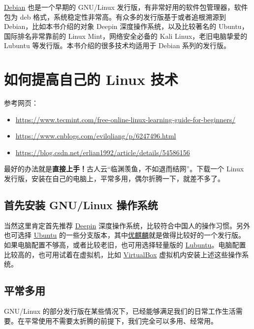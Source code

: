\documentclass[doctor,openright,twoside]{sjtuthesis}
\providecommand{\tightlist}{%
    \setlength{\itemsep}{0pt}\setlength{\parskip}{0pt}}
\theoremstyle{plain}
\theoremstyle{definition}
\theoremstyle{remark}
\theoremstyle{ocrenumbox}
\theoremstyle{plain}
\newcommand\cqh{“}
\newcommand\cqt{”}
\begin{document}
\href{https://baike.baidu.com/item/Debian}{Debian} 也是一个早期的
GNU/Linux 发行版，有非常好用的软件包管理器，软件包为 deb
格式，系统稳定性非常高。有众多的发行版基于或者追根溯源到
Debian，比如本书介绍的对象 Deepin 深度操作系统，以及比较著名的
Ubuntu，国际排名非常靠前的 Linux Mint，网络安全必备的 Kali
Linux，老旧电脑挚爱的 Lubuntu 等发行版。本书介绍的很多技术均适用于
Debian 系列的发行版。

\hypertarget{-linux-}{%
\section{如何提高自己的 Linux 技术}\label{-linux-}}

参考网页：

\begin{itemize}
\tightlist
\item
  \url{https://www.tecmint.com/free-online-linux-learning-guide-for-beginners/}
\item
  \url{https://www.cnblogs.com/evilqliang/p/6247496.html}
\item
  \url{https://blog.csdn.net/erlian1992/article/details/54586156}
\end{itemize}

最好的办法就是\textbf{直接上手！}古人云\cqh 临渊羡鱼，不如退而结网\cqt 。下载一个
Linux 发行版，安装在自己的电脑上，平常多用，偶尔折腾一下，就差不多了。

\hypertarget{-gnulinux-}{%
\subsection{首先安装 GNU/Linux 操作系统}\label{-gnulinux-}}

当然这里肯定首先推荐 \href{https://www.deepin.org/}{Deepin}
深度操作系统，比较符合中国人的操作习惯。另外也可选择
\href{https://www.ubuntu.com/global}{Ubuntu}
的一些分支版本，其中\href{https://www.ubuntukylin.com/}{优麒麟}就是做得比较好的一个发行版。
如果电脑配置不够高，或者比较老旧，也可用选择轻量版的
\href{https://lubuntu.net/}{Lubuntu}。电脑配置比较高的，也可用试着在虚拟机，比如
\href{https://www.virtualbox.org/}{VirtualBox}
虚拟机内安装上述这些操作系统。

\subsection{平常多用}

GNU/Linux
的部分发行版在某些情况下，已经能够满足我们的日常工作生活需要。在平常使用不需要太折腾的前提下，我们完全可以多用、经常用。
\end{document}
